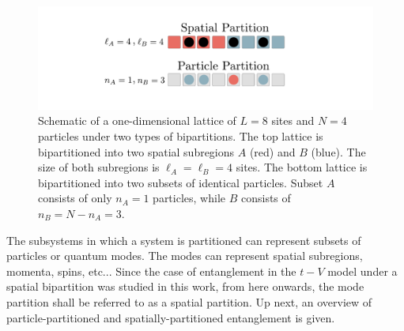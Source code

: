 \begin{figure}[h]
\begin{center}
\includegraphics[width=1.0\textwidth]{Images/spatialParticle.pdf}
\end{center}
\caption{Schematic of a one-dimensional lattice of $L=8$ sites and $N=4$ particles under two types of bipartitions. The top lattice is bipartitioned into two spatial subregions $A$ (red) and $B$ (blue). The size of both subregions is $\ell_A = \ell_B = 4$ sites. The bottom lattice is bipartitioned into two subsets of identical particles. Subset $A$ consists of only $n_A=1$ particles, while $B$ consists of $n_B = N - n_A = 3$.}
\label{fig:spatialParticle}
\end{figure}

	
	The subsystems in which a system is partitioned can represent subsets of particles or quantum modes. The modes can represent spatial subregions, momenta, spins, etc... Since the case of entanglement in the $t-V$ model under a spatial bipartition was studied in this work, from here onwards, the mode partition shall be referred to as a spatial partition. Up next, an overview of particle-partitioned and spatially-partitioned entanglement is given.

